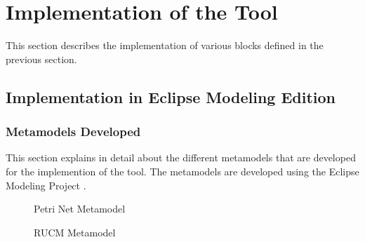 \section{Implementation of the Tool}
This section describes the implementation of various blocks defined in the previous section.

\subsection{Implementation in Eclipse Modeling Edition}
\subsubsection{Metamodels Developed}
This section explains in detail about the different metamodels that are developed for the implemention of the tool. The metamodels are developed using the Eclipse Modeling Project \cite{eclipse}.
\begin{figure}[htb!]
\centering
{}
\caption{Petri Net Metamodel}
\label{fig:petrimetamodel}
\end{figure}

\begin{figure}[htb!]
\centering
{}
\caption{RUCM Metamodel}
\label{fig:rucmmetamodel}
\end{figure}

